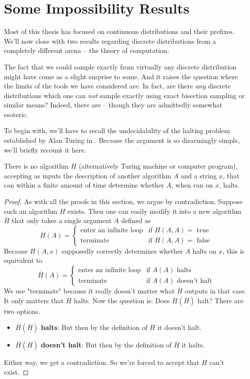 \section{Some Impossibility Results}

Most of this thesis has focused on continuous distributions and their prefixes. We'll now close with two results regarding discrete distributions from a completely different arena -- the theory of computation. 

The fact that we could sample exactly from virtually any discrete distribution might have come as a slight surprise to some. And it raises the question where the limits of the tools we have considered are. In fact, are there \textit{any} discrete distributions which one can \textit{not} sample exactly using exact bisection sampling or similar means? Indeed, there are -- though they are admittedly somewhat esoteric.

To begin with, we'll have to recall the undecidability of the halting problem established by Alan Turing in \cite{Turing}. Because the argument is so disarmingly simple, we'll briefly recount it here.

\begin{theorem}
	There is no algorithm $H$ (alternatively Turing machine or computer program), accepting as inputs the description of another algorithm $A$ and a string $x$, that can within a finite amount of time determine whether $A$, when run on $x$, halts.
\end{theorem}
\begin{proof}
As with all the proofs in this section, we argue by contradiction. Suppose such an algorithm $H$ exists. Then one can easily modify it into a new algorithm $\overline{H}$ that only takes a single argument $A$ defined as 
\[
\overline{H}(A) =
\begin{cases}
\text{enter an infinite loop} & \text{if }H(A,A)=\text{ true}\\
\text{terminate} & \text{if }H(A,A)=\text{ false}
\end{cases}
\]
Because $H(A, x)$ supposedly correctly determines whether $A$ halts on $x$, this is equivalent to
\[
\overline{H}(A) =
\begin{cases}
\text{enter an infinite loop} & \text{if }A(A)\text{ halts}\\
\text{terminate} & \text{if }A(A)\text{ doesn't halt}
\end{cases}
\]
We use "terminate" because it really doesn't matter what $\overline{H}$ outputs in that case. It only matters that $\overline{H}$ halts. Now the question is: Does $\overline{H}(\overline{H})$ halt? There are two options.
\begin{itemize}
	\item $\overline{H}(\overline{H})$ \textbf{halts}: But then by the definition of $\overline{H}$ it doesn't halt. \lightning
	\item $\overline{H}(\overline{H})$ \textbf{doesn't halt}: But then by the definition of $\overline{H}$ it halts. \lightning
\end{itemize}
Either way, we get a contradiction. So we're forced to accept that $H$ can't exist.
\end{proof}

